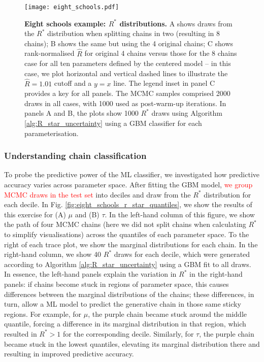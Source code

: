 \documentclass{article}
\begin{document}
\begin{figure}[!htb]
	\centerline{\texttt{[image: eight\_schools.pdf]}}
	\caption{\textbf{Eight schools example: $R^*$ distributions.} A shows draws from the $R^*$ distribution when splitting chains in two (resulting in 8 chains); B shows the same but using the 4 original chains; C shows rank-normalised $\widehat{R}$ for original 4 chains versus those for the 8 chains case for all ten parameters defined by the centered model -- in this case, we plot horizontal and vertical dashed lines to illustrate the $\widehat{R}=1.01$ cutoff and a $y=x$ line. The legend inset in panel C provides a key for all panels. The MCMC samples comprised 2000 draws in all cases, with 1000 used as post-warm-up iterations. In panels A and B, the plots show 1000 $R^*$ draws using Algorithm \ref{alg:R_star_uncertainty} using a GBM classifier for each parameterisation.}
	\label{fig:eight_schools}
\end{figure}

\subsubsection{Understanding chain classification}
To probe the predictive power of the ML classifier, we investigated how predictive accuracy varies across parameter space. After fitting the GBM model, \textcolor{red}{we group MCMC draws in the test set} into deciles and draw from the $R^*$ distribution for each decile. In Fig. \ref{fig:eight_schools_r_star_quantiles}, we show the results of this exercise for (A) $\mu$ and (B) $\tau$. In the left-hand column of this figure, we show the path of four MCMC chains (here we did not split chains when calculating $R^*$ to simplify visualisations) across the quantiles of each parameter space. To the right of each trace plot, we show the marginal distributions for each chain. In the right-hand column, we show 40 $R^*$ draws for each decile, which were generated according to Algorithm \ref{alg:R_star_uncertainty} using a GBM fit to all draws. In essence, the left-hand panels explain the variation in $R^*$ in the right-hand panels: if chains become stuck in regions of parameter space, this causes differences between the marginal distributions of the chains; these differences, in turn, allow a ML model to predict the generative chain in those same sticky regions. For example, for $\mu$, the purple chain became stuck around the middle quantile, forcing a difference in its marginal distribution in that region, which resulted in $R^*>1$ for the corresponding decile. Similarly, for $\tau$, the purple chain became stuck in the lowest quantiles, elevating its marginal distribution there and resulting in improved predictive accuracy.
\end{document}
